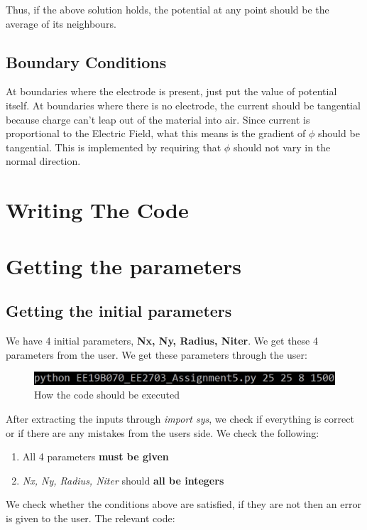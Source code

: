 \documentclass[11pt]{article}
\begin{document}
Thus, if the above solution holds, the potential at any point should be the average of its neighbours.

\subsection{Boundary Conditions}
At boundaries where the electrode is present, just put the value of
potential itself. At boundaries where there is no electrode, the current should be tangential because charge can’t leap out of the material into air. Since current is proportional to the Electric Field, what this means is the gradient of $\phi$ should be tangential. This is implemented by requiring that $\phi$ should not vary in the normal direction.

\section*{Writing The Code}
\setcounter{section}{0} %
\section{Getting the parameters}
\subsection{Getting the initial parameters}
We have 4 initial parameters, \textbf{Nx, Ny, Radius, Niter}. We get these 4 parameters from the user. We get these parameters through the user:

\begin{figure}[H]
    \centering
    \includegraphics[scale = 1.25]{Pic_1.jpg}
    \caption{How the code should be executed}
\end{figure}

After extracting the inputs through \textit{import sys}, we check if everything is correct or if there are any mistakes from the users side.
We check the following:

\begin{enumerate}
    \item All 4 parameters \textbf{must be given}
    \item \textit{Nx, Ny, Radius, Niter} should \textbf{all be integers}
\end{enumerate}

We check whether the conditions above are satisfied, if they are not then an error is given to the user. The relevant code:
\end{document}
